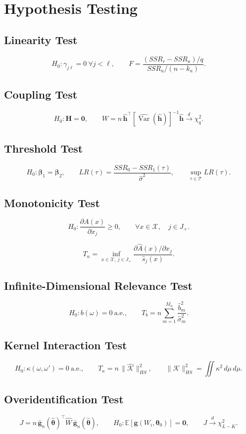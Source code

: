 \documentclass[11pt]{article}
\begin{document}
\section{Hypothesis Testing}

\subsection{Linearity Test}
\[
H_0:\gamma_{j\ell}=0\ \forall j<\ell,
\qquad F=\frac{(SSR_r-SSR_u)/q}{SSR_u/(n-k_u)}.
\]

\subsection{Coupling Test}
\[
H_0:\bm{H}=\bm{0},
\qquad W=n\,\hat{\bm{h}}^\top\left[\widehat{\operatorname{Var}}(\hat{\bm{h}})\right]^{-1}\hat{\bm{h}}\xrightarrow{d}\chi_q^2.
\]

\subsection{Threshold Test}
\[
H_0:\bm{\beta}_1=\bm{\beta}_2,
\qquad LR(\tau)=\frac{SSR_0-SSR_1(\tau)}{\hat\sigma^2},
\qquad \sup_{\tau\in\mathcal{T}}LR(\tau).
\]

\subsection{Monotonicity Test}

\[
H_0:
\frac{\partial A(x)}{\partial x_j}\geq 0,
\qquad
\forall x\in\mathcal X,\quad j\in J_+.
\]

\[
T_n
=
\inf_{x\in\mathcal X,\ j\in J_+}
\frac{
\partial \widehat A(x)/\partial x_j
}{
\widehat s_j(x)
}.
\]

\subsection{Infinite-Dimensional Relevance Test}
\[
H_0:b(\omega)=0\ \text{a.e.},
\qquad T_b=n\sum_{m=1}^{M_n}\frac{\hat b_m^2}{\hat\sigma_m^2}.
\]

\subsection{Kernel Interaction Test}
\[
H_0:\kappa(\omega,\omega')=0\ \text{a.e.},
\qquad T_\kappa=n\,\|\hat{\mathcal{K}}\|_{HS}^2,
\qquad \|\mathcal{K}\|_{HS}^2=\iint \kappa^2\,d\mu\,d\mu.
\]

\subsection{Overidentification Test}
\[
J=n\,\bar{\bm{g}}_n(\hat{\bm{\theta}})^\top \hat W\,\bar{\bm{g}}_n(\hat{\bm{\theta}}),
\qquad H_0:\mathbb{E}[\bm{g}(W_i,\bm{\theta}_0)]=\bm{0},
\qquad J\xrightarrow{d}\chi^2_{L-K}.
\]
\end{document}
